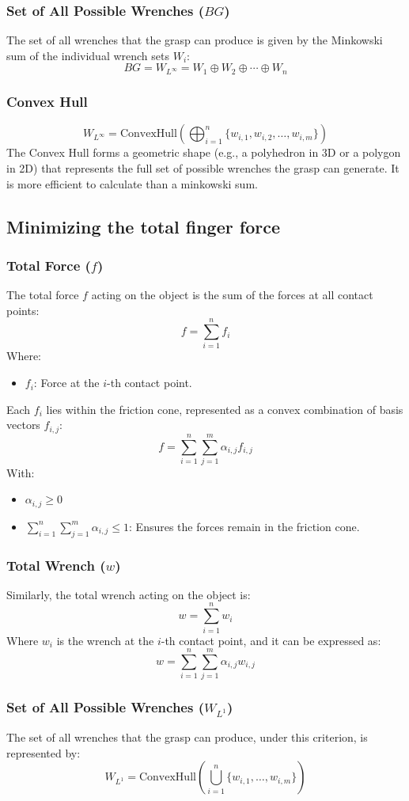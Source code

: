\documentclass[12pt]{article}
\begin{document}
\subsubsection{Set of All Possible Wrenches (\(BG\))}

The set of all wrenches that the grasp can produce is given by the Minkowski sum of the individual wrench sets \(W_i\):
\[
BG = W_{L^\infty} = W_1 \oplus W_2 \oplus \cdots \oplus W_n
\]

\subsubsection{Convex Hull}
\[
W_{L^\infty} = \text{ConvexHull}\left( \bigoplus_{i=1}^{n} \{w_{i,1}, w_{i,2}, \ldots, w_{i,m}\} \right)
\]
The Convex Hull forms a geometric shape (e.g., a polyhedron in 3D or a polygon in 2D) that represents the full set of possible wrenches the grasp can generate. It is more efficient to calculate than a minkowski sum.

\subsection{Minimizing the total finger force}
\subsubsection{Total Force (\(f\))}

The total force \(f\) acting on the object is the sum of the forces at all contact points:
\[
f = \sum_{i=1}^{n} f_i
\]
Where:
\begin{itemize}
    \item \(f_i\): Force at the \(i\)-th contact point.
\end{itemize}

Each \(f_i\) lies within the friction cone, represented as a convex combination of basis vectors \(f_{i,j}\):
\[
f = \sum_{i=1}^{n} \sum_{j=1}^{m} \alpha_{i,j} f_{i,j}
\]
With:
\begin{itemize}
    \item \(\alpha_{i,j} \geq 0\)
    \item \(\sum_{i=1}^{n} \sum_{j=1}^{m} \alpha_{i,j} \leq 1\): Ensures the forces remain in the friction cone.
\end{itemize}

\subsubsection{Total Wrench (\(w\))}

Similarly, the total wrench acting on the object is:
\[
w = \sum_{i=1}^{n} w_i
\]
Where \(w_i\) is the wrench at the \(i\)-th contact point, and it can be expressed as:
\[
w = \sum_{i=1}^{n} \sum_{j=1}^{m} \alpha_{i,j} w_{i,j}
\]

\subsubsection{Set of All Possible Wrenches (\(W_{L^1}\))}

The set of all wrenches that the grasp can produce, under this criterion, is represented by:
\[
W_{L^1} = \text{ConvexHull}\left( \bigcup_{i=1}^{n} \{w_{i,1}, \ldots, w_{i,m}\} \right)
\]
\end{document}
